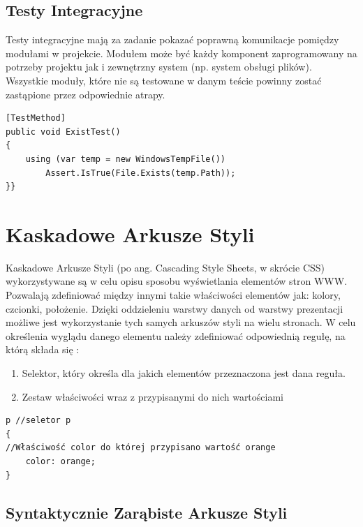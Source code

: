 \section{Testy Integracyjne}

Testy integracyjne mają za zadanie pokazać poprawną komunikacje pomiędzy modułami w projekcie. Modułem może być każdy komponent zaprogramowany na potrzeby projektu jak i zewnętrzny system (np. system obsługi plików). Wszystkie moduły, które nie są testowane w danym teście powinny zostać zastąpione przez odpowiednie atrapy.

\begin{lstlisting}[frame=single, numbers=none,captionpos=b, 
caption={Test integracyjny wykorzystany w projekcie.}]
[TestMethod]
public void ExistTest()
{
	using (var temp = new WindowsTempFile())
		Assert.IsTrue(File.Exists(temp.Path));
}}
\end{lstlisting}

\newpage
{\let\cleardoublepage\relax \chapter{Kaskadowe Arkusze Styli}}

Kaskadowe Arkusze Styli (po ang. Cascading Style Sheets, w skrócie CSS)\cite{CSSDoc} wykorzystywane są w celu opisu sposobu wyświetlania elementów stron WWW. Pozwalają zdefiniować między innymi takie właściwości elementów jak: kolory, czcionki, położenie. Dzięki oddzieleniu warstwy danych od warstwy prezentacji możliwe jest wykorzystanie tych samych arkuszów styli na wielu stronach. 
W celu określenia wyglądu danego elementu należy zdefiniować odpowiednią regułę, na którą składa się :
\begin{enumerate}
	\item Selektor, który określa dla jakich elementów przeznaczona jest dana reguła.
	\item Zestaw właściwości wraz z przypisanymi do nich wartościami
\end{enumerate}

\begin{lstlisting}[frame=single, numbers=none,captionpos=b, 
caption={Przykład prostej reguły, dzięki której wszystkie paragrafy będą miały domyślnie kolor pomarańczowy.}]
p //seletor p
{
//Właściwość color do której przypisano wartość orange
    color: orange;
}
\end{lstlisting}

\section{Syntaktycznie Zarąbiste Arkusze Styli}

